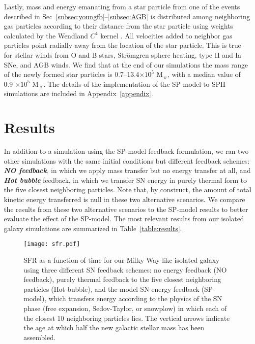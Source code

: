 \documentclass[iop]{emulateapj}
\begin{document}


Lastly, mass and energy emanating from a star particle from one of the events described in Sec~\ref{subsec:youngfb}--\ref{subsec:AGB} is distributed among neighboring gas particles according to their distance from the star particle using weights calculated by the Wendland $C^4$ kernel \citep{Dehnen12}. All velocities added to neighbor gas particles point radially away from the location of the star particle. This is true for stellar winds from O and B stars, Str\"omgren sphere heating, type II and Ia SNe, and AGB winds. We find that at the end of our simulations the mass range of the newly formed star particles is 0.7--13.4$\times 10^5$ M$_{\sun}$, with a median value of 0.9 $\times 10^5$ M$_{\sun}$. The details of the implementation of the SP-model to SPH simulations are included in Appendix~\ref{appendix}.

\section{Results}\label{sec:results}
In addition to a simulation using the SP-model feedback formulation, we ran two other simulations with the same initial conditions but different feedback schemes: \textbf{\textit{NO feedback}}, in which we apply mass transfer but no energy transfer at all, and \textbf{\textit{Hot bubble}} feedback, in which we transfer SN energy in purely thermal form to the five closest neighboring particles. Note that, by construct, the amount of total kinetic energy transferred is null in these two alternative scenarios. We compare the results from these two alternative scenarios to the SP-model results to better evaluate the effect of the SP-model. The most relevant results from our isolated galaxy simulations are summarized in Table~\ref{table:results}.

\begin{figure}
\texttt{[image: sfr.pdf]}
\caption{SFR as a function of time for our Milky Way-like isolated galaxy using three different SN feedback schemes: no energy feedback (NO feedback), purely thermal feedback to the five closest neighboring particles (Hot bubble), and the model SN energy feedback (SP-model), which transfers energy according to the physics of the SN phase (free expansion, Sedov-Taylor, or snowplow) in which each of the closest 10 neighboring particles lies. The vertical arrows indicate the age at which half the new galactic stellar mass has been assembled.}
\label{fig:SFR_isolated}
\end{figure}
\end{document}
